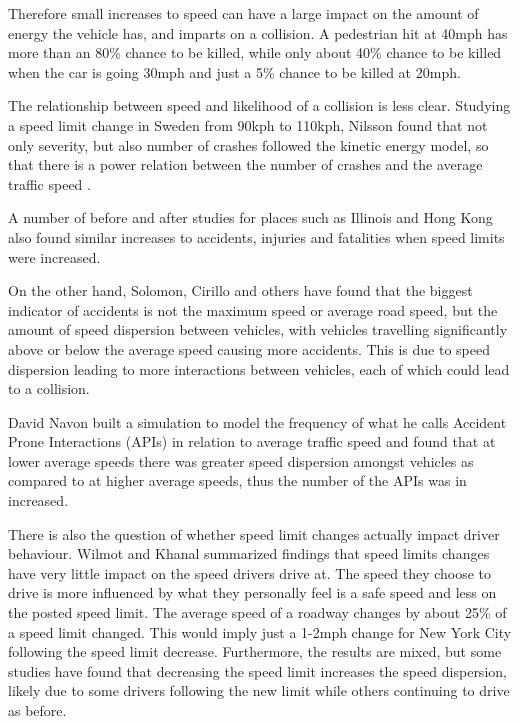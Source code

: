 \documentclass[10pt,journal,compsoc]{IEEEtran}
\begin{document}
Therefore small increases to speed can have a large impact on the amount of energy the vehicle has, and imparts on a collision.  A pedestrian hit at 40mph has more than an 80\% chance to be killed, while only about 40\% chance to be killed when the car is going 30mph and just a 5\% chance to be killed at 20mph\cite{fatalityrates}.

The relationship between speed and likelihood of a collision is less clear. Studying a speed limit change in Sweden from 90kph to 110kph, Nilsson found that not only severity, but also number of crashes followed the kinetic energy model, so that there is a power relation between the number of crashes and the average traffic speed \cite{aarts2006driving}.  

A number of before and after studies for places such as Illinois\cite{rock1995impact} and Hong Kong\cite{wong2005would} also found similar increases to accidents, injuries and fatalities when speed limits were increased.

On the other hand, Solomon, Cirillo and others have found that the biggest indicator of accidents is not the maximum speed or average road speed, but the amount of speed dispersion between vehicles, with vehicles travelling significantly above or below the average speed causing more accidents\cite{aarts2006driving}.  This is due to speed dispersion leading to more interactions between vehicles, each of which could lead to a collision.  

David Navon built a simulation to model the frequency of what he calls Accident Prone Interactions (APIs)  in relation to average traffic speed and found that at lower average speeds there was greater speed dispersion amongst vehicles as compared to at higher average speeds, thus the number of the APIs was in increased\cite{navon2003paradox}.  

There is also the question of whether speed limit changes actually impact driver behaviour.  Wilmot and Khanal summarized findings that speed limits changes have very little impact on the speed drivers drive at.  The speed they choose to drive is more influenced by what they personally feel is a safe speed and less on the posted speed limit.  The average speed of a roadway changes by about 25\% of a speed limit changed.  This would imply just a 1-2mph change for New York City following the speed limit decrease.  Furthermore, the results are mixed, but some studies have found that decreasing the speed limit increases the speed dispersion, likely due to some drivers following the new limit while others continuing to drive as before\cite{wilmot1999effect}.
\end{document}
